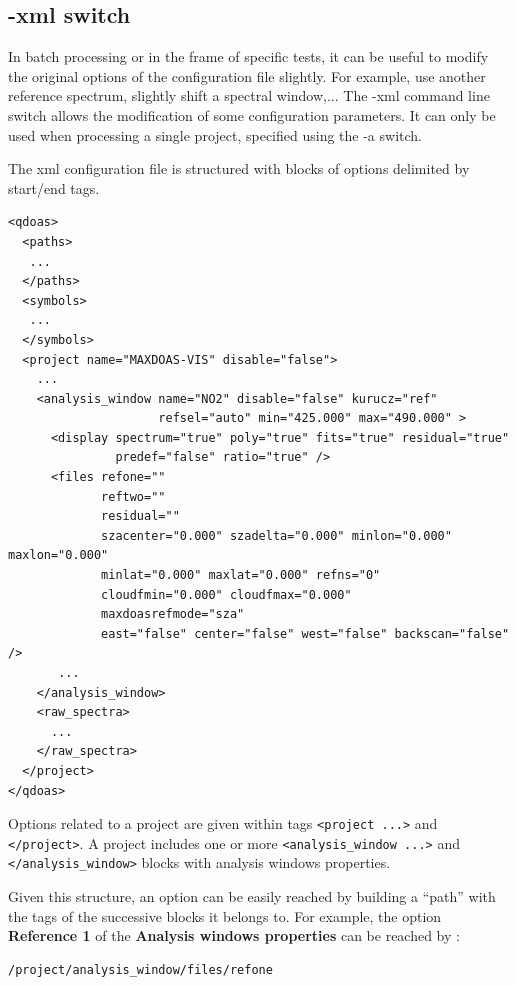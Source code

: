 \subsection{-xml switch}

In batch processing or in the frame of specific tests, it can be
useful to modify the original options of the configuration file
slightly.  For example, use another reference spectrum, slightly shift
a spectral window,...  The -xml command line switch allows the
modification of some configuration parameters.  It can only be used
when processing a single project, specified using the -a switch.

The xml configuration file is structured with blocks of options
delimited by start/end tags.

\begin{Verbatim}[fontfamily=courier,fontsize=\relsize{-2}]
<qdoas>
  <paths>
   ...
  </paths>
  <symbols>
   ...
  </symbols>
  <project name="MAXDOAS-VIS" disable="false">
    ...
    <analysis_window name="NO2" disable="false" kurucz="ref"
                     refsel="auto" min="425.000" max="490.000" >
      <display spectrum="true" poly="true" fits="true" residual="true"
               predef="false" ratio="true" />
      <files refone=""
             reftwo=""
             residual=""
             szacenter="0.000" szadelta="0.000" minlon="0.000" maxlon="0.000"
             minlat="0.000" maxlat="0.000" refns="0"
             cloudfmin="0.000" cloudfmax="0.000"
             maxdoasrefmode="sza"
             east="false" center="false" west="false" backscan="false" />
       ...
    </analysis_window>
    <raw_spectra>
      ...
    </raw_spectra>
  </project>
</qdoas>
\end{Verbatim}

Options related to a project are given within tags \texttt{<project
  ...>} and \texttt{</project>}.  A project includes one or more
\texttt{<analysis\_window ...>} and \texttt{</analysis\_window>}
blocks with analysis windows properties.

Given this structure, an option can be easily reached by building a
``path'' with the tags of the successive blocks it belongs to.  For
example, the option \textbf{Reference 1} of the \textbf{Analysis
  windows properties} can be reached by :

\begin{Verbatim}[fontfamily=courier,fontsize=\relsize{-2}]
/project/analysis_window/files/refone
\end{Verbatim}

